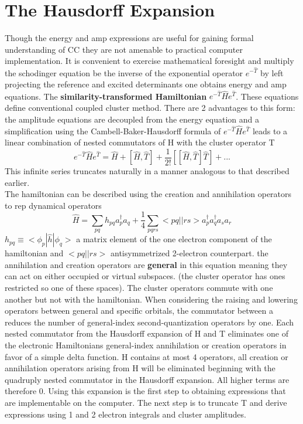 \documentclass[10pt, draft]{article}
\begin{document}
\section{The Hausdorff Expansion}
Though the energy and amp expressions are useful for gaining formal understanding of CC they are not amenable to practical computer implementation.  It is convenient to exercise mathematical foresight and multiply the schodinger equation be the inverse of the exponential operator $e^{-\hat{T}}$  by left projecting the reference and excited determinants one obtains energy and amp equations.  The \textbf{similarity-transformed Hamiltonian} $e^{-\hat{T}}\hat{H}e^{\hat{T}}$.  These equations define conventional coupled cluster method.  There are 2 advantages to this form: the amplitude equations are decoupled from the energy equation and a simplification using the Cambell-Baker-Hausdorff formula of  $e^{-\hat{T}}\hat{H}e^{\hat{T}}$ leads to a linear combination of nested commutators of H with the cluster operator T 
\[  e^{-\hat{T}}\hat{H}e^{\hat{T}} = \hat{H} + [\hat{H}, \hat{T}] + \frac{1}{2!} [[\hat{H}, \hat{T}] \hat{T}] + ...\]
This infinite series truncates naturally in a manner analogous to that described earlier.\\
The hamiltonian can be described using the creation and annihilation operators to rep dynamical operators 
\[ \hat{H} = \sum_{pq} h_{pq} a_p^\dagger a_q + \frac{1}{4}\sum_{pqrs}<pq||rs> a_p^\dagger a_q^\dagger a_s a_r \]
$h_{pq} \equiv <\phi_p|\hat{h}|\phi_q>$ a matrix element of the one electron component of the hamiltonian and $<pq||rs> $ antisymmetrized 2-electron counterpart. the annihilation and creation operators are \textbf{general} in this equation meaning they can act on either occupied or virtual subspaces.  (the cluster operator has ones restricted so one of these spaces).  The cluster operators commute with one another but not with the hamiltonian.  When considering the raising and lowering operators between general and specific orbitals, the commutator between a reduces the number of general-index second-quantization operators by one.  Each nested commutator from the Hausdorff expansion of H and T eliminates one of the electronic Hamiltonians general-index annihilation or creation operators in favor of a simple delta function.  H contains at most 4 operators, all creation or annihilation operators arising from H will be eliminated beginning with the quadruply nested commutator in the Hausdorff expansion.  All higher terms are therefore 0.  Using this expansion is the first step to obtaining expressions that are implementable on the computer.  The next step is to truncate T and derive expressions using 1 and 2 electron integrals and cluster amplitudes.  
\end{document}
